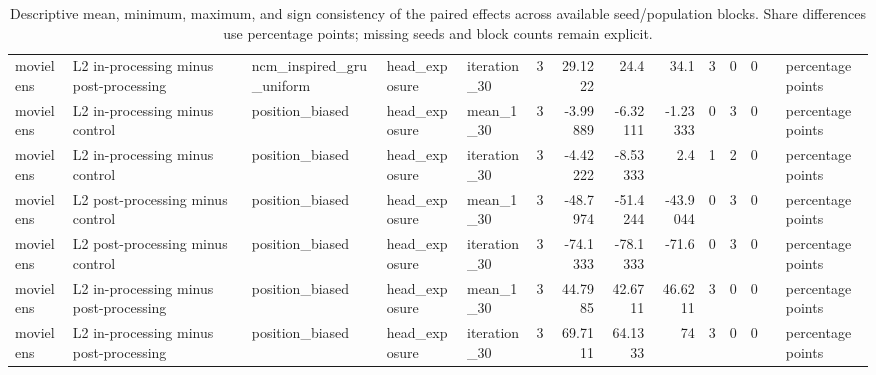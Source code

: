\begin{table}[htbp!]
\begin{tabular}{lllllrrrrrrrll}
movielens & L2 in-processing minus post-processing & ncm\_inspired\_gru\_uniform & head\_exposure & iteration\_30 & 3 & 29.1222 & 24.4 & 34.1 & 3 & 0 & 0 &  & percentage points \\
movielens & L2 in-processing minus control & position\_biased & head\_exposure & mean\_1\_30 & 3 & -3.99889 & -6.32111 & -1.23333 & 0 & 3 & 0 &  & percentage points \\
movielens & L2 in-processing minus control & position\_biased & head\_exposure & iteration\_30 & 3 & -4.42222 & -8.53333 & 2.4 & 1 & 2 & 0 &  & percentage points \\
movielens & L2 post-processing minus control & position\_biased & head\_exposure & mean\_1\_30 & 3 & -48.7974 & -51.4244 & -43.9044 & 0 & 3 & 0 &  & percentage points \\
movielens & L2 post-processing minus control & position\_biased & head\_exposure & iteration\_30 & 3 & -74.1333 & -78.1333 & -71.6 & 0 & 3 & 0 &  & percentage points \\
movielens & L2 in-processing minus post-processing & position\_biased & head\_exposure & mean\_1\_30 & 3 & 44.7985 & 42.6711 & 46.6211 & 3 & 0 & 0 &  & percentage points \\
movielens & L2 in-processing minus post-processing & position\_biased & head\_exposure & iteration\_30 & 3 & 69.7111 & 64.1333 & 74 & 3 & 0 & 0 &  & percentage points \\
\hline
\end{tabular}
\caption{Descriptive mean, minimum, maximum, and sign consistency of the paired effects across available seed/population blocks. Share differences use percentage points; missing seeds and block counts remain explicit.}
\label{chap:results:tab:rq4_seed_consistency_head_exposure}
\end{table}
